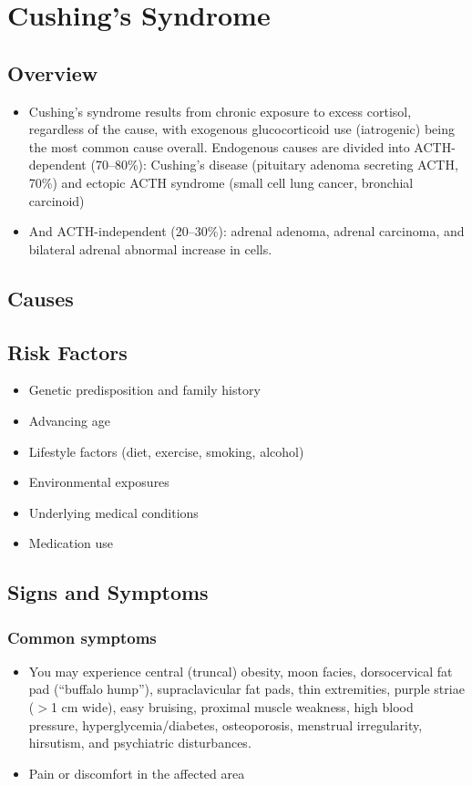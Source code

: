 \chapter{Cushing's Syndrome}
\label{sec:Cushing's Syndrome}

\section{Overview}


\begin{itemize}[noitemsep]
  \item Cushing's syndrome results from chronic exposure to excess cortisol, regardless of the cause, with exogenous glucocorticoid use (iatrogenic) being the most common cause overall. Endogenous causes are divided into ACTH-dependent (70--80\%): Cushing's disease (pituitary adenoma secreting ACTH, 70\%) and ectopic ACTH syndrome (small cell lung cancer, bronchial carcinoid)
  \item And ACTH-independent (20--30\%): adrenal adenoma, adrenal carcinoma, and bilateral adrenal abnormal increase in cells.
\end{itemize}
\section{Causes}
\section{Risk Factors}

\begin{itemize}[noitemsep]
  \item Genetic predisposition and family history
  \item Advancing age
  \item Lifestyle factors (diet, exercise, smoking, alcohol)
  \item Environmental exposures
  \item Underlying medical conditions
  \item Medication use
\end{itemize}
\section{Signs and Symptoms}

\subsection{Common symptoms}
\begin{itemize}[noitemsep]
  \item You may experience central (truncal) obesity, moon facies, dorsocervical fat pad (``buffalo hump''), supraclavicular fat pads, thin extremities, purple striae ($>$1 cm wide), easy bruising, proximal muscle weakness, high blood pressure, hyperglycemia/diabetes, osteoporosis, menstrual irregularity, hirsutism, and psychiatric disturbances.

  \item Pain or discomfort in the affected area
  \end{itemize}

